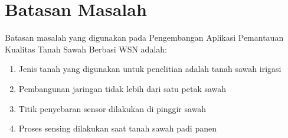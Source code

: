 
\section{Batasan Masalah}
\label{sec:batasan}
Batasan masalah yang digunakan pada Pengembangan Aplikasi Pemantauan Kualitas Tanah Sawah Berbasi WSN adalah:
    \begin{enumerate}
        \item Jenis tanah yang digunakan untuk penelitian adalah tanah sawah irigasi
        \item Pembangunan jaringan tidak lebih dari satu petak sawah
        \item Titik penyebaran sensor dilakukan di pinggir sawah
        \item Proses sensing dilakukan saat tanah sawah padi panen
    \end{enumerate}



